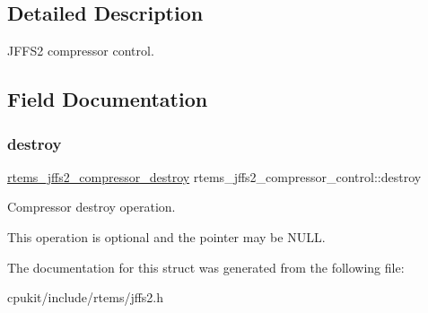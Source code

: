 \subsection{Detailed Description}
J\+F\+F\+S2 compressor control. 

\subsection{Field Documentation}
\mbox{\label{structrtems__jffs2__compressor__control_a41708878229606f5220e18baf582aa59}} 
\subsubsection{\texorpdfstring{destroy}{destroy}}
{\footnotesize\ttfamily \mbox{\hyperlink{group__JFFS2_ga728f7d3454f5621b992c0c40447ae0a3}{rtems\+\_\+jffs2\+\_\+compressor\+\_\+destroy}} rtems\+\_\+jffs2\+\_\+compressor\+\_\+control\+::destroy}



Compressor destroy operation. 

This operation is optional and the pointer may be {\ttfamily N\+U\+LL}. 

The documentation for this struct was generated from the following file\+:\begin{DoxyCompactItemize}
\item 
cpukit/include/rtems/jffs2.\+h\end{DoxyCompactItemize}
